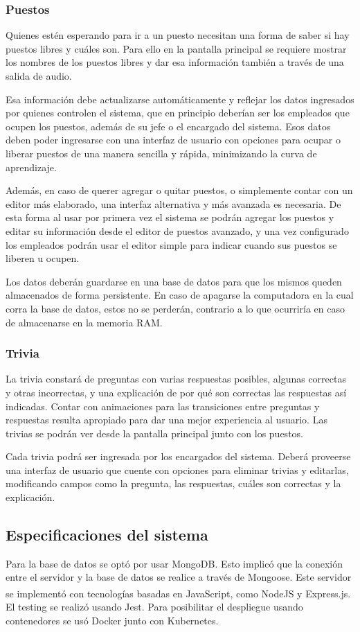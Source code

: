 \documentclass[twoside]{article}
\begin{document}
\subsubsection{Puestos}
Quienes estén esperando para ir a un puesto necesitan una forma de saber si hay puestos libres y cuáles son. Para ello en la pantalla principal se requiere mostrar los nombres de los puestos libres y dar esa información también a través de una salida de audio.

Esa información debe actualizarse automáticamente y reflejar los datos ingresados por quienes controlen el sistema, que en principio deberían ser los empleados que ocupen los puestos, además de su jefe o el encargado del sistema. Esos datos deben poder ingresarse con una interfaz de usuario con opciones para ocupar o liberar puestos de una manera sencilla y rápida, minimizando la curva de aprendizaje. 

Además, en caso de querer agregar o quitar puestos, o simplemente contar con un editor más elaborado, una interfaz alternativa y más avanzada es necesaria. De esta forma al usar por primera vez el sistema se podrán agregar los puestos y editar su información desde el editor de puestos avanzado, y una vez configurado los empleados podrán usar el editor simple para indicar cuando sus puestos se liberen u ocupen.

Los datos deberán guardarse en una base de datos para que los mismos queden almacenados de forma persistente. En caso de apagarse la computadora en la cual corra la base de datos, estos no se perderán, contrario a lo que ocurriría en caso de almacenarse en la memoria RAM.
\subsubsection{Trivia}
La trivia constará de preguntas con varias respuestas posibles, algunas correctas y otras incorrectas, y una explicación de por qué son correctas las respuestas así indicadas. Contar con animaciones para las transiciones entre preguntas y respuestas resulta apropiado para dar una mejor experiencia al usuario. Las trivias se podrán ver desde la pantalla principal junto con los puestos.

Cada trivia podrá ser ingresada por los encargados del sistema. Deberá proveerse una interfaz de usuario que cuente con opciones para eliminar trivias y editarlas, modificando campos como la pregunta, las respuestas, cuáles son correctas y la explicación.
\newpage
\subsection{Especificaciones del sistema}
Para la base de datos se optó por usar MongoDB. Esto implicó que la conexión entre el servidor y la base de datos se realice a través de Mongoose. Este servidor se implementó con tecnologías basadas en JavaScript, como NodeJS\textsuperscript{\textregistered} y Express.js. El testing se realizó usando Jest. Para posibilitar el despliegue usando contenedores se usó Docker junto con Kubernetes.
\end{document}
